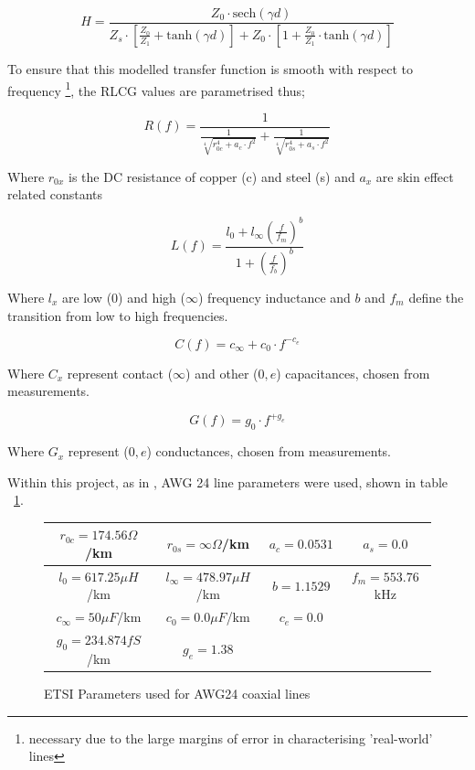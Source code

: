 \begin{equation}\label{eq:DSLTransferFunc}
H=\frac{Z_0 \cdot \text{sech}(\gamma d)}{Z_s \cdot [\frac{Z_0}{Z_1} +\text{tanh}(\gamma d)]+Z_0 \cdot[1+\frac{Z_0}{Z_1} \cdot \text{tanh}(\gamma d)]}
\end{equation}

To ensure that this modelled transfer function is smooth with respect to frequency \footnote{necessary due to the large margins of error in characterising 'real-world' lines}, the RLCG values are parametrised thus;

\begin{equation}\label{fig:R}
R(f) = \frac{1}{\frac{1}{\sqrt[4]{r^4_{0c}+a_c\cdot f^2}} + \frac{1}{\sqrt[4]{r^4_{0s}+a_s\cdot f^2}}}
\end{equation}

Where \(r_{0x}\) is the DC resistance of copper (c) and steel (s) and \(a_x\) are skin effect related constants

\begin{equation}\label{fig:L}
L(f) = \frac{l_0+l_{\infty}(\frac{f}{f_m})^b}{1+(\frac{f}{f_b})^b}
\end{equation}

Where \(l_x\) are low (0) and high (\(\infty\)) frequency inductance and \(b\) and \(f_m\) define the transition from low to high frequencies.

\begin{equation}\label{fig:C}
C(f)= c_{\infty} + c_0 \cdot f^{-c_e}
\end{equation}

Where \(C_x\) represent contact (\(\infty\)) and other (\(0,e\)) capacitances, chosen from measurements.

\begin{equation}\label{fig:G}
G(f)=g_0\cdot f^{+g_e}
\end{equation}

Where \(G_x\) represent (\(0,e\)) conductances, chosen from measurements.

Within this project, as in \cite{AM09}, AWG 24 line parameters were used, shown in table ~\ref{tab:AWG24Tbl}.

\begin{figure}[h!]
  \centering
  \begin{tabular}{|c|c|c|c|}\hline
    \(r_{0c}=174.56 \Omega\)/km&\(r_{0s}=\infty \Omega\)/km&\(a_c=0.0531\)&\(a_s=0.0\)\\\hline
    \(l_{0}=617.25 \mu H\)/km&\(l_{\infty} = 478.97 \mu H\)/km&\(b=1.1529\)&\(f_m=553.76\)kHz\\\hline
    \(c_{\infty} = 50 \mu F\)/km&\(c_0=0.0\mu F\)/km&\(c_e=0.0\)&\\\hline
    \(g_0 = 234.874 fS\)/km&\(g_e=1.38\)&&\\\hline
  \end{tabular}
  \caption{ETSI Parameters used for AWG24 coaxial lines}
  \label{tab:AWG24Tbl}
\end{figure}


